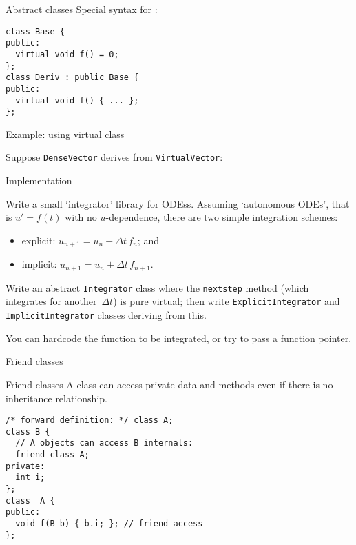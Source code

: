 \begin{block}{Abstract classes}
  \label{sl:abstract-class}
  Special syntax for :
  \lstset{style=snippetcode}
\begin{lstlisting}
class Base {
public:
  virtual void f() = 0;
};
class Deriv : public Base {
public:
  virtual void f() { ... };
};
\end{lstlisting}
\end{block}

\begin{block}{Example: using virtual class}
  \small
  \begin{multicols}{2}
    \vfill\columnbreak
    Suppose \lstinline{DenseVector} derives from \lstinline{VirtualVector}:\\
  \end{multicols}
\end{block}

\begin{block}{Implementation}
  \footnotesize
  \begin{multicols}{2}
  \end{multicols}
\end{block}

\begin{exercise}
  Write a small `integrator' library for
  \acp{ODE}s. Assuming `autonomous \acp{ODE}', that is $u'=f(t)$ with
  no $u$-dependence, there are two simple integration schemes:
  \begin{itemize}
  \item explicit: $u_{n+1} = u_n+\Delta t\,f_n$; and
  \item implicit: $u_{n+1} = u_n+\Delta t\,f_{n+1}$.
  \end{itemize}
  Write an abstract \lstinline{Integrator} class where the
  \lstinline{nextstep} method (which integrates for another~$\Delta t$) is pure virtual;
  then write
  \lstinline{ExplicitIntegrator} and \lstinline{ImplicitIntegrator}
  classes deriving from this.


  You can hardcode the function to be integrated, or try to pass a function pointer.
\end{exercise}

 {Friend classes}

\begin{block}{Friend classes}
  \label{sl:obj-friend}
  A  class can access private data and methods
  even if there is no inheritance relationship.
  \lstset{style=snippetcode}
\begin{lstlisting}
/* forward definition: */ class A;
class B {
  // A objects can access B internals:
  friend class A;
private:
  int i;
};
class  A {
public: 
  void f(B b) { b.i; }; // friend access
};
\end{lstlisting}
\end{block}

